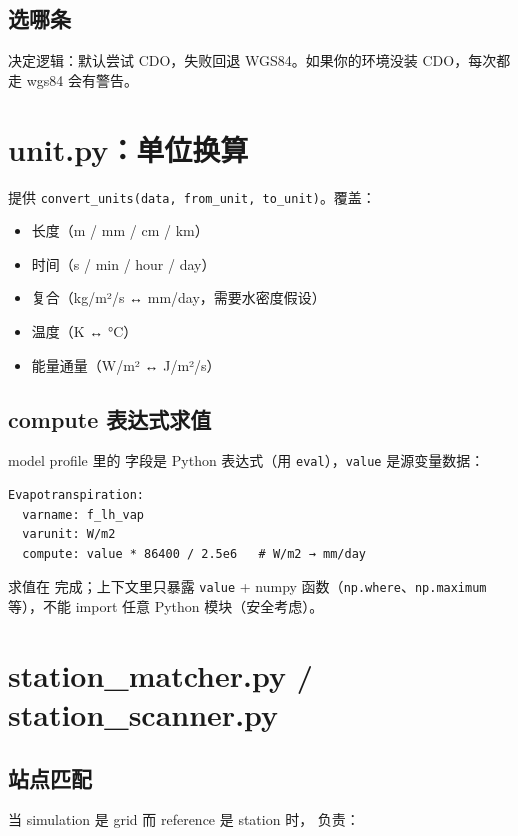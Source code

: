 \subsection{选哪条}

 决定逻辑：默认尝试 CDO，失败回退 WGS84。如果你的环境没装 CDO，每次都走 wgs84 会有警告。

\section{unit.py：单位换算}

 提供 \texttt{convert\_units(data, from\_unit, to\_unit)}。覆盖：

\begin{itemize}
  \item 长度（m / mm / cm / km）
  \item 时间（s / min / hour / day）
  \item 复合（kg/m²/s ↔ mm/day，需要水密度假设）
  \item 温度（K ↔ °C）
  \item 能量通量（W/m² ↔ J/m²/s）
\end{itemize}

\subsection{compute 表达式求值}

model profile 里的  字段是 Python 表达式（用 \texttt{eval}），\texttt{value} 是源变量数据：

\begin{verbatim}
Evapotranspiration:
  varname: f_lh_vap
  varunit: W/m2
  compute: value * 86400 / 2.5e6   # W/m2 → mm/day
\end{verbatim}

求值在  完成；上下文里只暴露 \texttt{value} + numpy 函数（\texttt{np.where}、\texttt{np.maximum} 等），不能 import 任意 Python 模块（安全考虑）。

\section{station\_matcher.py / station\_scanner.py}

\subsection{站点匹配}

当 simulation 是 grid 而 reference 是 station 时， 负责：

